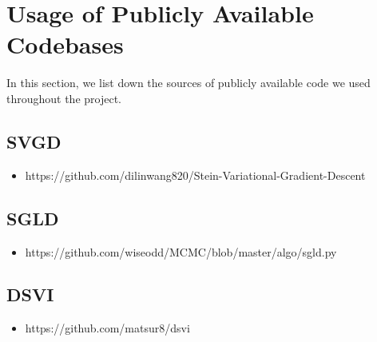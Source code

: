 \section{Usage of Publicly Available Codebases}
In this section, we list down the sources of publicly available code we used throughout the project.
\subsection{SVGD}
\begin{itemize}
    \item https://github.com/dilinwang820/Stein-Variational-Gradient-Descent
\end{itemize}

\subsection{SGLD}
\begin{itemize}
    \item https://github.com/wiseodd/MCMC/blob/master/algo/sgld.py
\end{itemize}

\subsection{DSVI}
\begin{itemize}
    \item https://github.com/matsur8/dsvi
\end{itemize}
